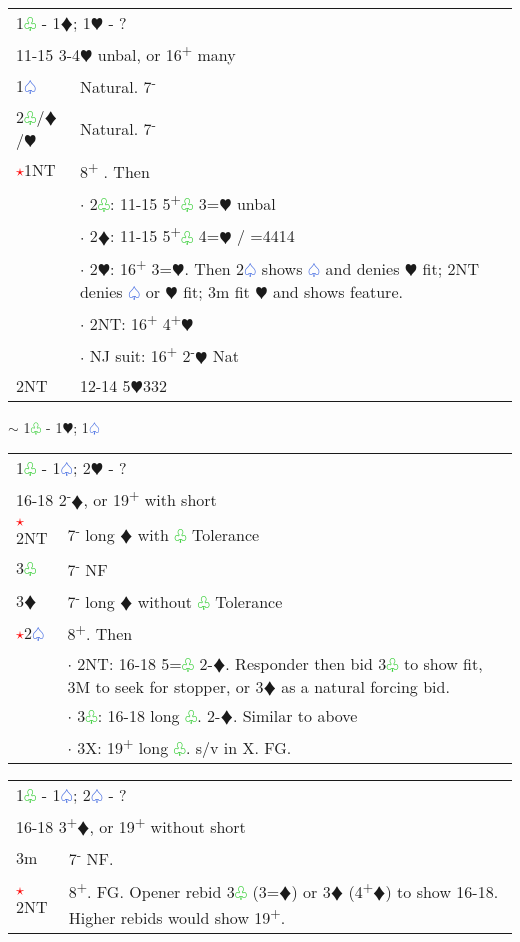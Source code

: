 \documentclass{article}
\renewcommand{\sp}{\textcolor{RoyalBlue}{$\varspade$}}
\newcommand{\he}{\textcolor{RubineRed}{$\varheart$}}
\newcommand{\di}{\textcolor{Peach}{$\vardiamond$}}
\newcommand{\cl}{\textcolor{LimeGreen}{$\varclub$}}
\newcommand{\nt}{\relsize{-1}NT\relsize{1}}
\newcommand{\up}{\textsuperscript{+}}
\newcommand{\down}{\textsuperscript{-}}
\newcommand{\al}{\textcolor{red}{$\star$}}
\begin{document}
\begin{tabular}{|l|p{6.5cm}}
	\multicolumn{2}{l}{1\cl{} - 1\di{}; 1\he{} - ?}\\
	\multicolumn{2}{l}{11-15 3-4\he{} unbal, or 16\up{} many}\\
    1\sp{} & Natural. 7\down{} \\
    2\cl{}/\di{}/\he{} & Natural. 7\down{} \\
    \al{}1\nt{} & 8\up{} . Then \\
    & $\cdot$ 2\cl{}: 11-15 5\up{}\cl{} 3=\he{} unbal \\
    & $\cdot$ 2\di{}: 11-15 5\up{}\cl{} 4=\he{} / =4414 \\
    & $\cdot$ 2\he{}: 16\up{} 3=\he{}. Then 2\sp{} shows \sp{} and denies \he{} fit; 2\nt{} denies \sp{} or \he{} fit; 3m fit \he{} and shows feature. \\
    & $\cdot$ 2\nt{}: 16\up{} 4\up{}\he{} \\
    & $\cdot$ NJ suit: 16\up{} 2\down{}\he{} Nat \\
		2\nt{} & 12-14 5\he{}332 \\ 
\end{tabular}

$\sim$ 1\cl{} - 1\he{}; 1\sp{}\\

\begin{tabular}{|l|p{6.5cm}}
	\multicolumn{2}{l}{1\cl{} - 1\sp{}; 2\he{} - ?} \\
	\multicolumn{2}{l}{16-18 2\down{}\di{}, or 19\up{} with short} \\
	\al{}2\nt{} & 7\down{} long \di{} with \cl{} Tolerance \\
	3\cl{} & 7\down{} NF \\
	3\di{} & 7\down{} long \di{} without \cl{} Tolerance \\
	\al{}2\sp{} & 8\up{}. Then \\
	& $\cdot$ 2\nt: 16-18 5=\cl{} 2-\di{}. Responder then bid 3\cl{} to show fit, 3M to seek for stopper, or 3\di{} as a natural forcing bid. \\
	& $\cdot$ 3\cl{}: 16-18 long \cl{}. 2-\di{}. Similar to above \\
	& $\cdot$ 3X: 19\up{} long \cl{}. s/v in X. FG. \\
\end{tabular}

\medskip

\begin{tabular}{|l|p{6.5cm}}
	\multicolumn{2}{l}{1\cl{} - 1\sp{}; 2\sp{} - ?}\\
	\multicolumn{2}{l}{16-18 3\up{}\di{}, or 19\up{} without short} \\
	3m & 7\down{} NF. \\
	\al{}2\nt & 8\up{}. FG. Opener rebid 3\cl{} (3=\di{}) or 3\di{} (4\up{}\di{}) to show 16-18. Higher rebids would show 19\up{}. \\
\end{tabular}
\end{document}

